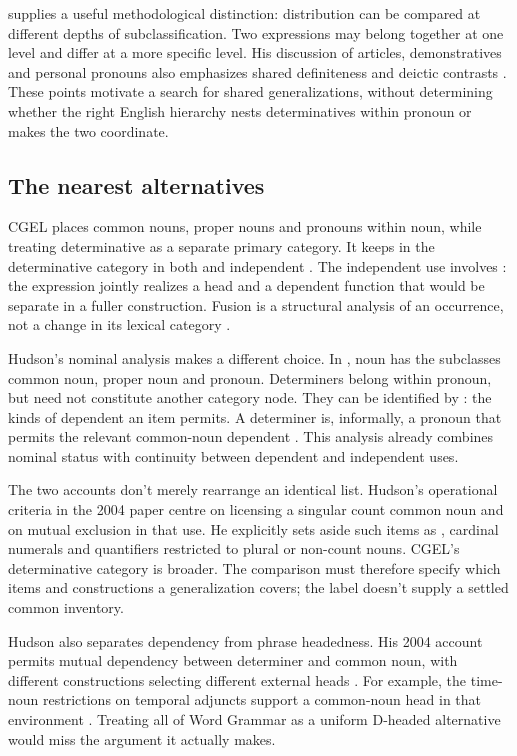 \documentclass[12pt]{article}
\begin{document}
\textcite[232--235]{lyons1968} supplies a useful methodological distinction: distribution can be compared at different depths of subclassification. Two expressions may belong together at one level and differ at a more specific level. His discussion of articles, demonstratives and personal pronouns also emphasizes shared definiteness and deictic contrasts \citep[279]{lyons1968}. These points motivate a search for shared generalizations, without determining whether the right English hierarchy nests determinatives within pronoun or makes the two coordinate.

\subsection{The nearest alternatives}

CGEL places common nouns, proper nouns and pronouns within noun, while treating determinative as a separate primary category. It keeps  in the determinative category in both  and independent . The independent use involves : the expression jointly realizes a head and a dependent function that would be separate in a fuller construction. Fusion is a structural analysis of an occurrence, not a change in its lexical category \citep[410--412]{huddleston2002}.

Hudson's nominal analysis makes a different choice. In \textcite[253--254]{hudson2010wordgrammar}, noun has the subclasses common noun, proper noun and pronoun. Determiners belong within pronoun, but need not constitute another category node. They can be identified by : the kinds of dependent an item permits. A determiner is, informally, a pronoun that permits the relevant common-noun dependent \citep[9--10]{hudson2004determiners}. This analysis already combines nominal status with continuity between dependent and independent uses.

The two accounts don't merely rearrange an identical list. Hudson's operational criteria in the 2004 paper centre on licensing a singular count common noun and on mutual exclusion in that use. He explicitly sets aside such items as , cardinal numerals and quantifiers restricted to plural or non-count nouns. CGEL's determinative category is broader. The comparison must therefore specify which items and constructions a generalization covers; the label  doesn't supply a settled common inventory.

Hudson also separates dependency from phrase headedness. His 2004 account permits mutual dependency between determiner and common noun, with different constructions selecting different external heads \citep[7--9]{hudson2004determiners}. For example, the time-noun restrictions on temporal adjuncts support a common-noun head in that environment \citep[10--12]{hudson2004determiners}. Treating all of Word Grammar as a uniform D-headed alternative would miss the argument it actually makes.
\end{document}
